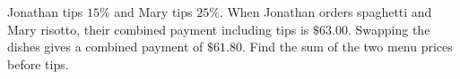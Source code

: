 Jonathan tips $15\%$ and Mary tips $25\%$. When Jonathan orders spaghetti and Mary risotto, their combined payment including tips is $\$63.00$. Swapping the dishes gives a combined payment of $\$61.80$. Find the sum of the two menu prices before tips.
